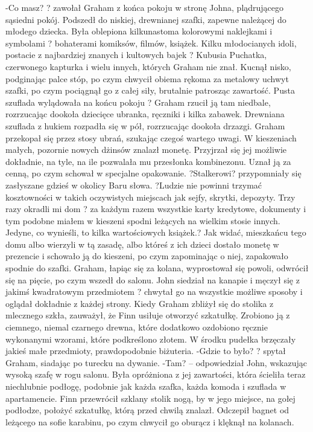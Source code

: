 \documentclass[../MAIN.tex]{subfiles}
\begin{document}
-Co masz? ? zawołał Graham z końca pokoju w stronę Johna, plądrującego sąsiedni pokój. Podszedł do niskiej, drewnianej szafki, zapewne należącej do młodego dziecka. Była oblepiona kilkunastoma kolorowymi naklejkami i symbolami ? bohaterami komiksów, filmów, książek. Kilku młodocianych idoli, postacie z najbardziej znanych i kultowych bajek ? Kubusia Puchatka, czerwonego kapturka i wielu innych, których Graham nie znał.
Kucnął nisko, podginając palce stóp, po czym chwycił obiema rękoma za metalowy uchwyt szafki, po czym pociągnął go z całej siły, brutalnie patrosząc zawartość. Pusta szuflada wylądowała na końcu pokoju ? Graham rzucił ją tam niedbale, rozrzucając dookoła dziecięce ubranka, ręczniki i kilka zabawek.
Drewniana szuflada z hukiem rozpadła się w pół, rozrzucając dookoła drzazgi.
Graham przekopał się przez stosy ubrań, szukając czegoś wartego uwagi. W kieszeniach małych, pozornie nowych dżinsów znalazł monetę. Przyjrzał się jej możliwie dokładnie, na tyle, na ile pozwalała mu przesłonka kombinezonu. Uznał ją za cenną, po czym schował w specjalne opakowanie.
?Stalkerowi? przypomniały się zasłyszane gdzieś w okolicy Baru słowa.
?Ludzie nie powinni trzymać kosztowności w takich oczywistych miejscach jak sejfy, skrytki, depozyty. Trzy razy okradli mi dom ? za każdym razem wszystkie karty kredytowe, dokumenty i tym podobne miałem w kieszeni spodni leżących na wielkim stosie innych. Jedyne, co wynieśli, to kilka wartościowych książek.?
Jak widać, mieszkańcu tego domu albo wierzyli w tą zasadę, albo któreś z ich dzieci dostało monetę w prezencie i schowało ją do kieszeni, po czym zapominając o niej, zapakowało spodnie do szafki.
Graham, łapiąc się za kolana, wyprostował się powoli, odwrócił się na pięcie, po czym wszedł do salonu. John siedział na kanapie i męczył się z jakimś kwadratowym przedmiotem ? chwytał go na wszystkie możliwe sposoby i oglądał dokładnie z każdej strony. Kiedy Graham zbliżył się do stolika z mlecznego szkła, zauważył, że Finn usiłuje otworzyć szkatułkę.
Zrobiono ją z ciemnego, niemal czarnego drewna, które dodatkowo ozdobiono ręcznie wykonanymi wzorami, które podkreślono złotem. W środku pudełka brzęczały jakieś małe przedmioty, prawdopodobnie biżuteria.
-Gdzie to było? ? spytał Graham, siadając po turecku na dywanie.
-Tam? -- odpowiedział John, wskazując wysoką szafę w rogu salonu. Była opróżniona z jej zawartości, która ścieliła teraz niechlubnie podłogę, podobnie jak każda szafka, każda komoda i szuflada w apartamencie.
Finn przewrócił szklany stolik nogą, by w jego miejsce, na gołej podłodze, położyć szkatułkę, którą przed chwilą znalazł. Odczepił bagnet od leżącego na sofie karabinu, po czym chwycił go oburącz i klęknął na kolanach.
\end{document}
